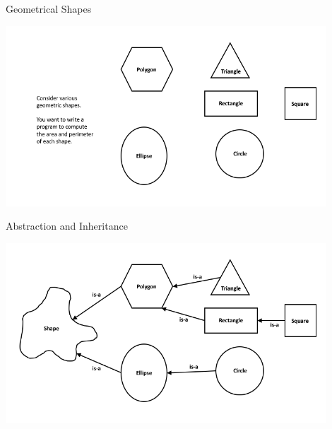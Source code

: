 \documentclass[11pt]{beamer}
\begin{document}
\begin{frame}[fragile]
\frametitle{}



\end{frame}


\begin{frame}{Geometrical Shapes} 
\begin{center} 
  \includegraphics[width=0.9\textwidth]{../../shared/shapes0.png} 
\end{center} 

\end{frame} 



\begin{frame}{Abstraction and Inheritance} 

\begin{center} 
  \includegraphics[width=0.9\textwidth]{../../shared/shapes.png} 
\end{center} 

\end{frame} 


\end{document}
